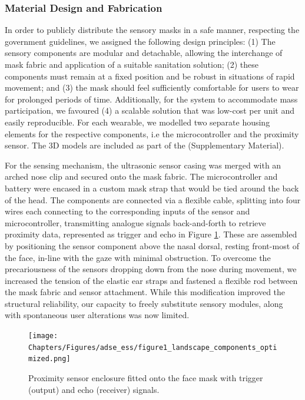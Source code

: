 \subsubsection{Material Design and Fabrication}
\label{subsec:fabrication}

In order to publicly distribute the sensory masks in a safe manner, respecting the government guidelines, we assigned the following design principles: (1) The sensory components are modular and detachable, allowing the interchange of mask fabric and application of a suitable sanitation solution; (2) these components must remain at a fixed position and be robust in situations of rapid movement; and (3) the mask should feel sufficiently comfortable for users to wear for prolonged periods of time. Additionally, for the system to accommodate mass participation, we favoured (4) a scalable solution that was low-cost per unit and easily reproducible. For each wearable, we modelled two separate housing elements for the respective components, i.e the microcontroller and the proximity sensor. The 3D models are included as part of the (Supplementary Material). 

For the sensing mechanism, the ultrasonic sensor casing was merged with an arched nose clip and secured onto the mask fabric. The microcontroller and battery were encased in a custom mask strap that would be tied around the back of the head. The components are connected via a flexible cable, splitting into four wires each connecting to the corresponding inputs of the sensor and microcontroller, transmitting analogue signals back-and-forth to retrieve proximity data, represented as trigger and echo in Figure \ref{fig:sensor_model}. These are assembled by positioning the sensor component above the nasal dorsal, resting front-most of the face, in-line with the gaze with minimal obstruction. To overcome the precariousness of the sensors dropping down from the nose during movement, we increased the tension of the elastic ear straps and fastened a flexible rod between the mask fabric and sensor attachment. While this modification improved the structural reliability, our capacity to freely substitute sensory modules, along with spontaneous user alterations was now limited.

\begin{figure}[!h]
\captionsetup{width=1.0\textwidth}
\centering
\texttt{[image: Chapters/Figures/adse\_ess/figure1\_landscape\_components\_optimized.png]}
{\caption[Proximity sensor enclosure fitted onto the face mask.]{Proximity sensor enclosure fitted onto the face mask with trigger (output) and echo (receiver) signals.
}\label{fig:sensor_model}}
\vspace*{-20pt}
\end{figure}

